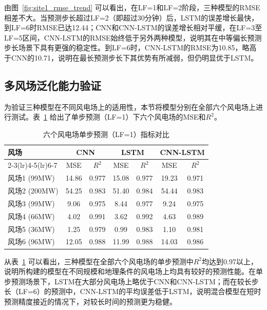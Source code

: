 由图~\ref{fig:site1_rmse_trend} 可以看出，在LF=1和LF=2阶段，三种模型的RMSE相差不大。当预测步长超过LF=2（即超过30分钟）后，LSTM的误差增长最快，到LF=6时RMSE已达12.44；CNN和CNN-LSTM的误差增长相对平缓，在LF=3至LF=5区间，CNN-LSTM的RMSE始终低于另外两种模型，说明其在中等偏长预测步长场景下具有更强的稳定性。到LF=6时，CNN-LSTM的RMSE为10.85，略高于CNN的10.71，说明在最长预测步长下其优势有所减弱，但仍明显优于LSTM。

\subsection{多风场泛化能力验证}
为验证三种模型在不同风电场上的适用性，本节将模型分别在全部六个风电场上进行测试。表~\ref{tab:cross_site_lf1_metrics} 给出了单步预测（LF=1）下六个风电场的MSE和$R^2$。

\begin{table}[H]
    \centering
    \caption{六个风电场单步预测（LF=1）指标对比}
    \label{tab:cross_site_lf1_metrics}
    \begin{tabular}{lcccccc}
        \toprule
        \multirow{2}{*}{风场} & \multicolumn{2}{c}{CNN} & \multicolumn{2}{c}{LSTM} & \multicolumn{2}{c}{CNN-LSTM} \\
        \cmidrule(lr){2-3}\cmidrule(lr){4-5}\cmidrule(lr){6-7}
        & MSE & $R^2$ & MSE & $R^2$ & MSE & $R^2$ \\
        \midrule
        风场1 (99MW) & 14.86 & 0.977 & 15.08 & 0.977 & 19.23 & 0.971 \\
        风场2 (200MW)& 54.25 & 0.983 & 51.40 & 0.984 & 54.44 & 0.983 \\
        风场3 (99MW) &  9.06 & 0.975 &  8.44 & 0.977 &  9.24 & 0.975 \\
        风场4 (66MW) &  4.02 & 0.991 &  3.62 & 0.992 &  4.63 & 0.989 \\
        风场5 (36MW) &  1.25 & 0.979 &  0.99 & 0.983 &  1.10 & 0.981 \\
        风场6 (96MW) & 12.05 & 0.988 & 11.99 & 0.988 & 14.03 & 0.986 \\
        \bottomrule
    \end{tabular}
\end{table}

从表~\ref{tab:cross_site_lf1_metrics} 可以看出，三种模型在全部六个风电场的单步预测中$R^2$均达到0.97以上，说明所构建的模型在不同规模和地理条件的风电场上均具有较好的预测性能。在单步预测场景下，LSTM在大部分风电场上略优于CNN和CNN-LSTM；而在较长步长（LF=6）的预测中，CNN-LSTM的平均误差低于LSTM，说明混合模型在短时预测精度接近的情况下，对较长时间的预测更为稳健。

